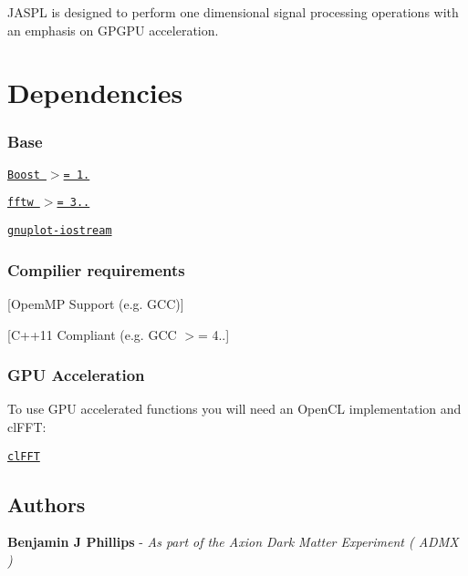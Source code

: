J\+A\+S\+PL is designed to perform one dimensional signal processing operations with an emphasis on G\+P\+G\+PU acceleration.

\section*{Dependencies}

\subsubsection*{Base}


\begin{DoxyItemize}
\item \href{http://www.boost.org/users/download/}{\tt Boost $>$= 1.}
\item \href{http://www.fftw.org/download.html}{\tt fftw $>$= 3..}
\item \href{https://github.com/dstahlke/gnuplot-iostream}{\tt gnuplot-\/iostream}
\end{DoxyItemize}

\subsubsection*{Compilier requirements}


\begin{DoxyItemize}
\item \mbox{[}Opem\+MP Support (e.\+g. G\+CC)\mbox{]}
\item \mbox{[}C++11 Compliant (e.\+g. G\+CC $>$= 4..\mbox{]}
\end{DoxyItemize}

\subsubsection*{G\+PU Acceleration}

To use G\+PU accelerated functions you will need an Open\+CL implementation and cl\+F\+FT\+:


\begin{DoxyItemize}
\item \href{https://github.com/clMathLibraries/clFFT}{\tt cl\+F\+FT}
\end{DoxyItemize}

\subsection*{Authors}


\begin{DoxyItemize}
\item {\bfseries Benjamin J Phillips} -\/ {\itshape As part of the Axion Dark Matter Experiment ( A\+D\+MX )} 
\end{DoxyItemize}